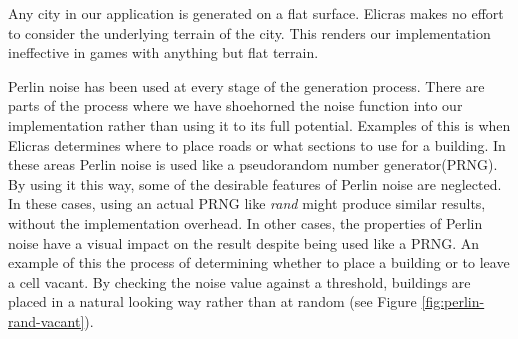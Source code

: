 Any city in our application is generated on a flat surface. Elicras makes no effort to consider the underlying terrain of the city. This renders our implementation ineffective in games with anything but flat terrain.
\par
Perlin noise has been used at every stage of the generation process. There are parts of the process where we have shoehorned the noise function into our implementation rather than using it to its full potential. Examples of this is when Elicras determines where to place roads or what sections to use for a building. In these areas Perlin noise is used like a pseudorandom number generator(PRNG). By using it this way, some of the desirable features of Perlin noise are neglected. In these cases, using an actual PRNG like \textit{rand}\cite{RandCRT} might produce similar results, without the implementation overhead. In other cases, the properties of Perlin noise have a visual impact on the result despite being used like a PRNG. An example of this the process of determining whether to place a building or to leave a cell vacant. By checking the noise value against a threshold, buildings are placed in a natural looking way rather than at random (see Figure \ref{fig:perlin-rand-vacant}).